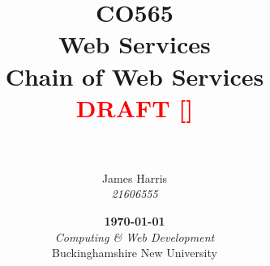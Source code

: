 \title{
  \Large CO565\\
  Web Services\\
  \vspace*{.65cm}\huge Chain of Web Services\\
  \vspace*{.65cm}\large\textcolor{red}{DRAFT  [\unskip]}\\
  \textcolor{red}{\DTMnow}\\
  \vfill
}
\author{
  James Harris\\
  \textit{21606555}
}
\date{
  \vfill\textbf\today\\
  \vspace*{.75cm}\textit{Computing \& Web Development}\\
  Buckinghamshire New University
}
\maketitle
{}
